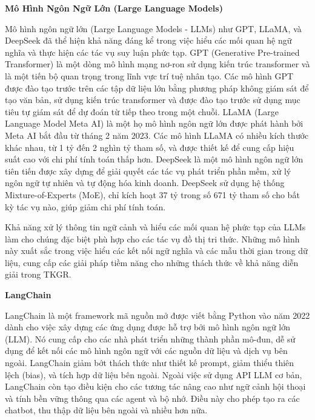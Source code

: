 \vspace{1em}
\textbf{Mô Hình Ngôn Ngữ Lớn (Large Language Models)}

Mô hình ngôn ngữ lớn (Large Language Models - LLMs) như GPT, LLaMA, và DeepSeek đã thể hiện khả năng đáng kể trong việc hiểu các mối quan hệ ngữ nghĩa và thực hiện các tác vụ suy luận phức tạp. GPT (Generative Pre-trained Transformer) là một dòng mô hình mạng nơ-ron sử dụng kiến trúc transformer \cite{ref_article36} và là một tiến bộ quan trọng trong lĩnh vực trí tuệ nhân tạo. Các mô hình GPT được đào tạo trước trên các tập dữ liệu lớn bằng phương pháp không giám sát để tạo văn bản, sử dụng kiến trúc transformer và được đào tạo trước sử dụng mục tiêu tự giám sát để dự đoán từ tiếp theo trong một chuỗi. LLaMA (Large Language Model Meta AI) là một họ mô hình ngôn ngữ lớn được phát hành bởi Meta AI bắt đầu từ tháng 2 năm 2023. Các mô hình LLaMA có nhiều kích thước khác nhau, từ 1 tỷ đến 2 nghìn tỷ tham số, và được thiết kế để cung cấp hiệu suất cao với chi phí tính toán thấp hơn. DeepSeek là một mô hình ngôn ngữ lớn tiên tiến được xây dựng để giải quyết các tác vụ phát triển phần mềm, xử lý ngôn ngữ tự nhiên và tự động hóa kinh doanh. DeepSeek sử dụng hệ thống Mixture-of-Experts (MoE), chỉ kích hoạt 37 tỷ trong số 671 tỷ tham số cho bất kỳ tác vụ nào, giúp giảm chi phí tính toán.

Khả năng xử lý thông tin ngữ cảnh và hiểu các mối quan hệ phức tạp của LLMs làm cho chúng đặc biệt phù hợp cho các tác vụ đồ thị tri thức. Những mô hình này xuất sắc trong việc hiểu các kết nối ngữ nghĩa và các mẫu thời gian trong dữ liệu, cung cấp các giải pháp tiềm năng cho những thách thức về khả năng diễn giải trong TKGR.

\vspace{1em}
\textbf{LangChain}

LangChain \cite{ref_article37} là một framework mã nguồn mở được viết bằng Python vào năm 2022 dành cho việc xây dựng các ứng dụng được hỗ trợ bởi mô hình ngôn ngữ lớn (LLM). Nó cung cấp cho các nhà phát triển những thành phần mô-đun, dễ sử dụng để kết nối các mô hình ngôn ngữ với các nguồn dữ liệu và dịch vụ bên ngoài. LangChain giảm bớt thách thức như thiết kế prompt, giảm thiểu thiên lệch (bias), và tích hợp dữ liệu bên ngoài. Ngoài việc sử dụng API LLM cơ bản, LangChain còn tạo điều kiện cho các tương tác nâng cao như ngữ cảnh hội thoại và tính bền vững thông qua các agent và bộ nhớ. Điều này cho phép tạo ra các chatbot, thu thập dữ liệu bên ngoài và nhiều hơn nữa.

